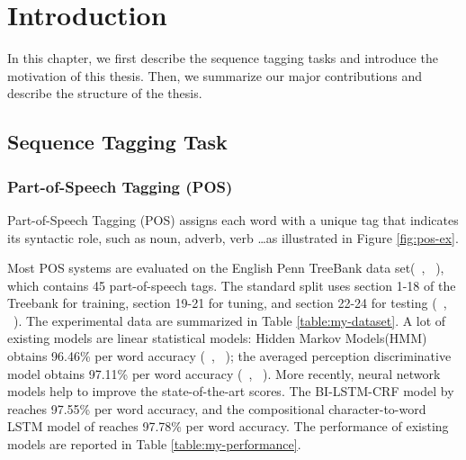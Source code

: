 \documentclass{sfuthesis}
\begin{document}
\tableofcontents\clearpage
{}\listoftables\clearpage
{}\listoffigures





%
%

\mainmatter%

\chapter{Introduction}

In this chapter, we first describe the sequence tagging tasks and introduce the motivation of this thesis. Then, we summarize our major contributions and describe the structure of the thesis.

\section{Sequence Tagging Task}

\subsection{Part-of-Speech Tagging (POS)}
Part-of-Speech Tagging (POS) assigns each word with a unique tag that indicates its syntactic role, such as noun, adverb, verb \dots as illustrated in Figure \ref{fig:pos-ex}. 

Most POS systems are evaluated on the English Penn TreeBank data set(~\citeauthor{marcus1993building}, ~\citeyear{marcus1993building}), which contains 45 part-of-speech tags. The standard split uses section 1-18 of the Treebank for training, section 19-21 for tuning, and section 22-24 for testing (~\citeauthor{toutanova2003feature}, ~\citeyear{toutanova2003feature}). The experimental data are summarized in Table \ref{table:my-dataset}. A lot of existing models are linear statistical models: Hidden Markov Models(HMM) obtains 96.46\% per word accuracy (~\citeauthor{mccallum2000maximum}, ~\citeyear{mccallum2000maximum}); the averaged perception discriminative model obtains 97.11\% per word accuracy (~\citeauthor{collins2002discriminative}, ~\citeyear{collins2002discriminative}). More recently, neural network models help to improve the state-of-the-art scores. The BI-LSTM-CRF model by \cite{huang2015bidirectional} reaches 97.55\% per word accuracy, and the compositional character-to-word LSTM model of \cite{ling2015finding} reaches 97.78\% per word accuracy. The performance of existing models are reported in Table \ref{table:my-performance}.
\end{document}
